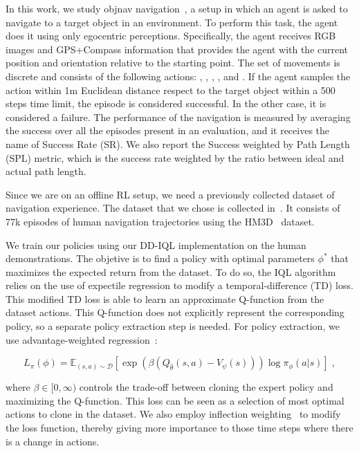 In this work, we study \acrshort{objnav} navigation~\cite{batra2020}, a setup in which an agent is asked to navigate to a target object in an environment.
To perform this task, the agent does it using only egocentric perceptions.
Specifically, the agent receives RGB images and GPS+Compass information that provides the agent with the current position and orientation relative to the starting point.
The set of movements is discrete and consists of the following actions: \turnleft, \turnright, \moveforward, \lookup, \lookdown and \stopac.
If the agent samples the \stopac action within 1m Euclidean distance respect to the target object within a 500 steps time limit, the episode is considered successful.
In the other case, it is considered a failure.
The performance of the navigation is measured by averaging the success over all the episodes present in an evaluation, and it receives the name of Success Rate (SR).
We also report the Success weighted by Path Length (SPL) metric, which is the success rate weighted by the ratio between ideal and actual path length.

Since we are on an offline RL setup, we need a previously collected dataset of navigation experience.
The dataset that we chose is collected in~\cite{ramrakhya2023}.
It consists of 77k episodes of human navigation trajectories using the HM3D~\cite{Ramakrishnan2021HabitatMatterport3D} dataset.

We train our policies using our DD-IQL implementation on the human demonstrations.
The objetive is to find a policy with optimal parameters $\phi^*$ that maximizes the expected return from the dataset.
To do so, the IQL algorithm relies on the use of expectile regression to modify a temporal-difference (TD) loss.
This modified TD loss is able to learn an approximate Q-function from the dataset actions.
This Q-function does not explicitly represent the corresponding policy, so a separate policy extraction step is needed.
For policy extraction, we use advantage-weighted regression~\cite{peters2007, peng2019advantageweighted}:

\begin{equation}
    L_\pi(\phi)=\mathbb{E}_{(s, a) \sim \mathcal{D}}\left[\exp \left(\beta\left(Q_{\hat{\theta}}(s, a)-V_\psi(s)\right)\right) \log \pi_\phi(a|s)\right]\; ,
    \label{eq:loss}
\end{equation}

where $\beta \in [0, \infty)$ controls the trade-off between cloning the expert policy and maximizing the Q-function.
This loss can be seen as a selection of most optimal actions to clone in the dataset.
We also employ inflection weighting~\cite{wijmans2019} to modify the loss function, thereby giving more importance to those time steps where there is a change in actions.

